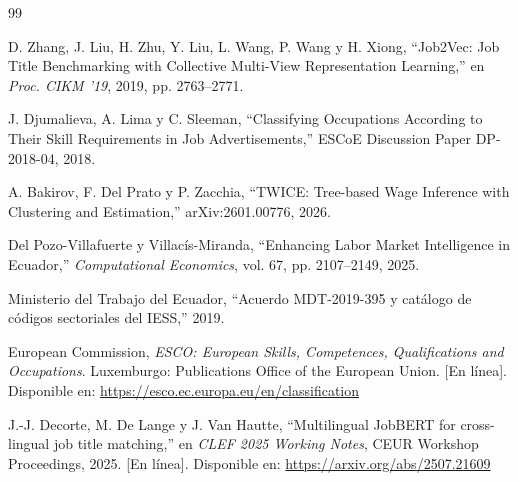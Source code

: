 \documentclass[12pt,a4paper,oneside]{report}
\newcommand{\pend}[1]{\textcolor{red}{\small[PENDIENTE: #1]}}
\begin{document}
\begin{thebibliography}{99}

D. Zhang, J. Liu, H. Zhu, Y. Liu, L. Wang, P. Wang y H. Xiong,
``Job2Vec: Job Title Benchmarking with Collective Multi-View Representation Learning,''
en \emph{Proc. CIKM '19}, 2019, pp. 2763--2771.

J. Djumalieva, A. Lima y C. Sleeman,
``Classifying Occupations According to Their Skill Requirements in Job Advertisements,''
ESCoE Discussion Paper DP-2018-04, 2018.

A. Bakirov, F. Del Prato y P. Zacchia,
``TWICE: Tree-based Wage Inference with Clustering and Estimation,''
arXiv:2601.00776, 2026.

Del Pozo-Villafuerte y Villacís-Miranda,
``Enhancing Labor Market Intelligence in Ecuador,''
\emph{Computational Economics}, vol. 67, pp. 2107--2149, 2025.

Ministerio del Trabajo del Ecuador,
``Acuerdo MDT-2019-395 y catálogo de códigos sectoriales del IESS,'' 2019.



European Commission, \emph{ESCO: European Skills, Competences, Qualifications and
Occupations}. Luxemburgo: Publications Office of the European Union.
[En línea]. Disponible en: \url{https://esco.ec.europa.eu/en/classification}

J.-J. Decorte, M. De Lange y J. Van Hautte, ``Multilingual JobBERT for cross-lingual job
title matching,'' en \emph{CLEF 2025 Working Notes}, CEUR Workshop Proceedings, 2025.
[En línea]. Disponible en: \url{https://arxiv.org/abs/2507.21609}


\end{thebibliography}
\end{document}

